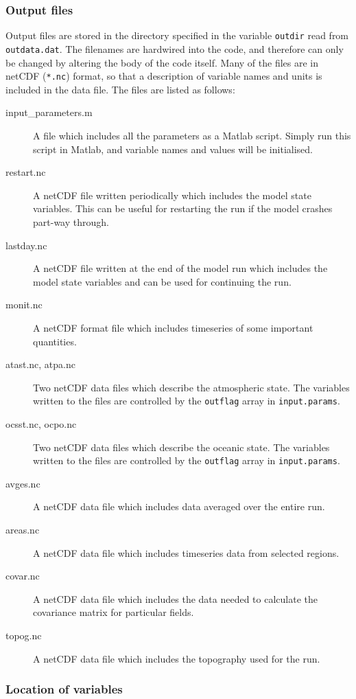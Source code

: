 \documentclass[11pt, a4paper,twoside]{article}
\numberwithin{equation}{section}
\begin{document}
\subsubsection{Output files}
Output files are stored in the directory specified in the variable \verb=outdir= read from  \verb=outdata.dat=.
The filenames are hardwired into the code, and therefore can only be changed by altering the body of the code itself.
Many of the files are in netCDF (\verb=*.nc=) format, so that a description of variable names and units is included in the data file.
The files are listed as follows:
\begin{description}
\item[input\_parameters.m] A file which includes all the parameters as a Matlab script.  Simply run this script in Matlab, and variable names and values will be initialised.
\item[restart.nc] A netCDF file written periodically which includes the model state variables.
This can be useful for restarting the run if the model crashes part-way through.
\item[lastday.nc] A netCDF file written at the end of the model run which includes the model state variables and can be used for continuing the run.
\item[monit.nc] A netCDF format file which includes timeseries of some important quantities.
\item[atast.nc, atpa.nc] Two netCDF data files which describe the atmospheric state.  The variables written to the files are controlled by the \verb=outflag= array in \verb=input.params=.
\item[ocsst.nc, ocpo.nc] Two netCDF data files which describe the oceanic state.  The variables written to the files are controlled by the \verb=outflag= array in \verb=input.params=.
\item[avges.nc] A netCDF data file which includes data averaged over the entire run.
\item[areas.nc] A netCDF data file which includes timeseries data from selected regions.
\item[covar.nc] A netCDF data file which includes the data needed to calculate the covariance matrix for particular fields.
\item[topog.nc] A netCDF data file which includes the topography used for the run.
\end{description}

\subsubsection{Location of variables}
\end{document}
